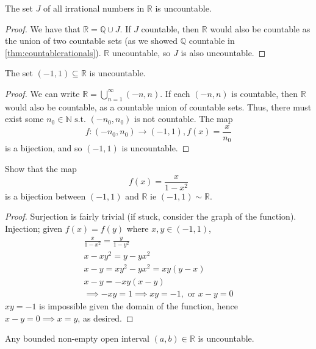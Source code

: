 \documentclass[12pt]{article}
\begin{document}
\begin{proposition}
  The set $J$ of all irrational numbers in $\mathbb{R}$ is uncountable.
\end{proposition}

\begin{proof}
  We have that $\mathbb{R} = \mathbb{Q} \cup J$. If $J$ countable, then $\mathbb{R}$ would also be countable as the union of two countable sets (as we showed $\mathbb{Q}$ countable in \cref{thm:countablerationals}). $\mathbb{R}$ uncountable, so $J$ is also uncountable.
\end{proof}

\begin{proposition}
  The set $(-1,1) \subseteq \mathbb{R}$ is uncountable.
\end{proposition}

\begin{proof}
  We can write $\mathbb{R} = \bigcup_{n=1}^\infty (-n,n)$. If each $(-n,n)$ is countable, then $\mathbb{R}$ would also be countable, as a countable union of countable sets. Thus, there must exist some $n_0 \in \mathbb{N} \text{ s.t. } (-n_0, n_0)$ is not countable. The map\[f: (-n_0, n_0) \to (-1,1), f(x) = \frac{x}{n_0}\] is a bijection, and so $(-1,1)$ is uncountable.
\end{proof}

\begin{example}
  Show that the map \[f(x) = \frac{x}{1-x^2}\] is a bijection between $(-1,1)$ and $\mathbb{R}$ ie $(-1,1) \sim \mathbb{R}$.


\begin{proof}
  Surjection is fairly trivial (if stuck, consider the graph of the function).\\Injection; given $f(x) = f(y)$ where $x,y \in (-1,1)$,\begin{align*}
    \frac{x}{1-x^2} = \frac{y}{1-y^2}\\
    x -xy^2 = y - yx^2\\
    x-y = xy^2 - yx^2 = xy(y - x)\\
    x-y = -xy(x-y)\\
    \implies -xy = 1 \implies xy = -1, \text{ or } x - y = 0
  \end{align*}
  $xy = -1$ is impossible given the domain of the function, hence $x -y = 0 \implies x = y$, as desired.
\end{proof}
\end{example}




\begin{proposition}
  Any bounded non-empty open interval $(a,b) \in \mathbb{R}$ is uncountable.
\end{proposition}
\end{document}
